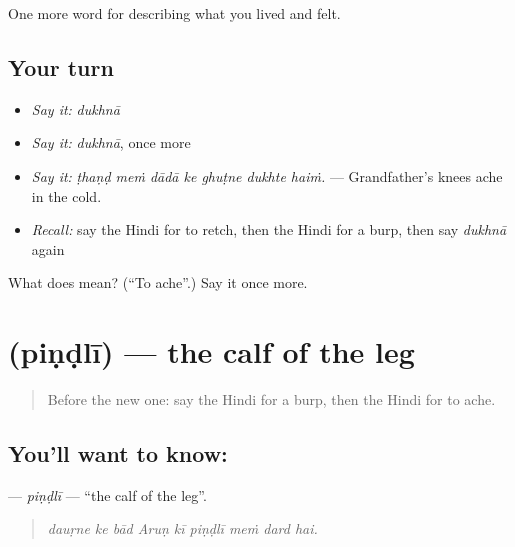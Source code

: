 \begin{grammarlens}[title={What you've built}]
One more word for describing what you lived and felt.
\end{grammarlens}

\subsection*{Your turn}
\begin{itemize}
\raggedright
  \item \emph{Say it:} \emph{dukhnā}
  \item \emph{Say it:} \emph{dukhnā}, once more
  \item \emph{Say it:} \emph{ṭhaṇḍ meṁ dādā ke ghuṭne dukhte haiṁ.} — Grandfather's knees ache in the cold.
  \item \emph{Recall:} say the Hindi for to retch, then the Hindi for a burp, then say \emph{dukhnā} again
\end{itemize}

\begin{tcolorbox}[breakable,colback=teal!4,colframe=teal!35!black,title={Before you move on}]
What does  mean? (\textquotedblleft{}To ache\textquotedblright{}.) Say it once more.
\end{tcolorbox}
\section[\texorpdfstring{\hi{पिंडली} (piṇḍlī)}{पिंडली (piṇḍlī)}]{ (piṇḍlī) — the calf of the leg}

\label{lesson:HI-C486-pindli}



\begin{quote}
Before the new one: say the Hindi for a burp, then the Hindi for to ache.
\end{quote}

\subsection*{You'll want to know: }
\textbf{} — \emph{piṇḍlī} — \textquotedblleft{}the calf of the leg\textquotedblright{}.

\begin{quote}
        
\end{quote}

\begin{quote}
\emph{dauṛne ke bād Aruṇ kī piṇḍlī meṁ dard hai.}
\end{quote}

